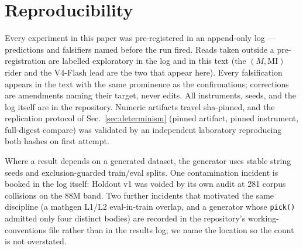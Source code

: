 \documentclass[11pt]{article}
\begin{document}
\section{Reproducibility}
\label{sec:repro}

Every experiment in this paper was pre-registered in an append-only log ---
predictions and falsifiers named before the run fired. Reads taken outside a
pre-registration are labelled exploratory in the log and in this text (the
$(M, \text{MI})$ rider and the V4-Flash lead are the two that appear here).
Every falsification appears in the text with the same prominence as the
confirmations; corrections are amendments naming their target, never edits. All
instruments, seeds, and the log itself are in the repository. Numeric artifacts
travel sha-pinned, and the replication protocol of Sec.~\ref{sec:determinism}
(pinned artifact, pinned instrument, full-digest compare) was validated by an
independent laboratory reproducing both hashes on first attempt.

Where a result depends on a generated dataset, the generator uses stable string
seeds and exclusion-guarded train/eval splits. One contamination incident is
booked in the log itself: Holdout v1 was voided by its own audit at 281 corpus
collisions on the 88M band. %
Two further incidents that motivated the same discipline (a mathgen L1/L2
eval-in-train overlap, and a generator whose \texttt{pick()} admitted only four
distinct bodies) are recorded in the repository's working-conventions file rather
than in the results log; we name the location so the count is not overstated.
\end{document}

